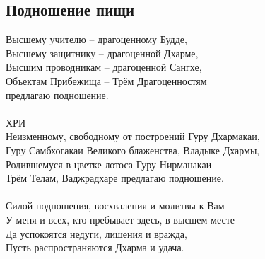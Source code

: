 \subsection{Подношение пищи}

\vspace{1cm}
Высшему учителю – драгоценному Будде, \\
Высшему защитнику –  драгоценной Дхарме,\\
Высшим проводникам –  драгоценной Сангхе,\\
Объектам Прибежища – Трём Драгоценностям \\ \indent предлагаю подношение.\\
\\
ХРИ\\
Неизменному, свободному от построений Гуру Дхармакаи, \\
Гуру Самбхогакаи Великого блаженства, Владыке Дхармы, \\
Родившемуся в цветке лотоса Гуру Нирманакаи — \\
Трём Телам, Ваджрадхаре предлагаю подношение.\\
\\
Силой подношения, восхваления и молитвы к Вам \\
У меня и всех, кто пребывает здесь, в высшем месте \\
Да успокоятся недуги, лишения и вражда, \\
Пусть распространяются Дхарма и удача.\\
\\


